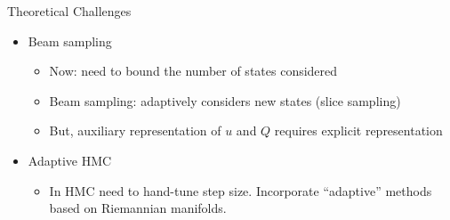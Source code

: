 \documentclass[11pt, mathserif, handout, table]{beamer}
\begin{document}
\begin{frame}{Theoretical Challenges}
  \begin{itemize}[<+->]
  \item Beam sampling
    \begin{itemize}
    \item Now: need to bound the number of states considered
    \item Beam sampling: adaptively considers new states (slice
      sampling)
    \item But, auxiliary representation of $u$ and $Q$ requires
      explicit representation
    \end{itemize}
  \item Adaptive HMC
    \begin{itemize}
    \item In HMC need to hand-tune step size.  Incorporate
      ``adaptive'' methods based on Riemannian manifolds.
    \end{itemize}
  \end{itemize}
\end{frame}
\end{document}
